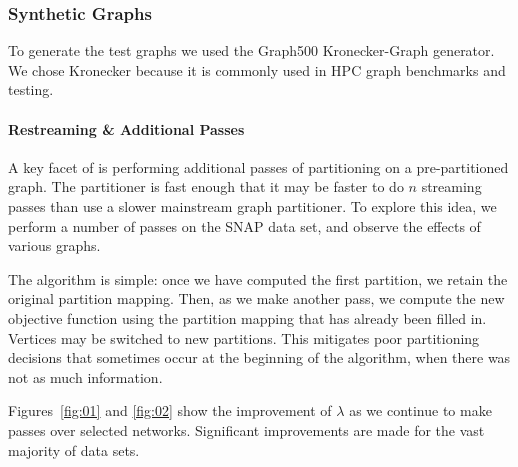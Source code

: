 
\subsubsection{Synthetic Graphs}
To generate the test graphs we used the Graph500 Kronecker-Graph generator.
We chose Kronecker because it is commonly used in HPC graph benchmarks and testing. 



\paragraph{Restreaming \& Additional Passes}
A key facet of \ourmethod is performing additional passes of partitioning on a pre-partitioned graph. 
The partitioner is fast enough that it may be faster to do $n$ streaming passes than use a slower mainstream graph partitioner.
To explore this idea, we perform a number of passes on the SNAP data set, and observe the effects of various graphs. 

The algorithm is simple: once we have computed the first partition, we retain the original partition mapping. 
Then, as we make another pass, we compute the new objective function using the partition mapping that has already been filled in. 
Vertices may be switched to new partitions. 
This mitigates poor partitioning decisions that sometimes occur at the beginning of the algorithm, when there was not as much information.

Figures~\ref{fig:01} and \ref{fig:02} show the improvement of $\lambda$ as we continue to make passes over selected networks. 
Significant improvements are made for the vast majority of data sets.




